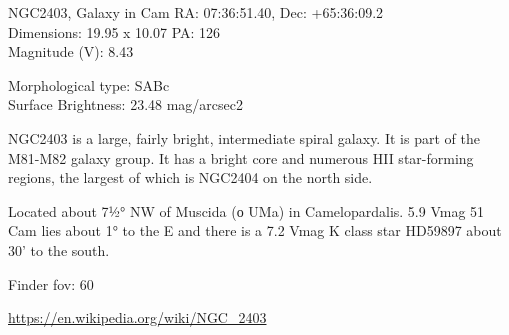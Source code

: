 \begin{block}{NGC2403, Galaxy in Cam}
    RA: 07:36:51.40, Dec: +65:36:09.2 \\ 
    Dimensions: 19.95 x 10.07 PA: 126 \\ 
    Magnitude (V): 8.43

    Morphological type: SABc \\ 
    Surface Brightness: 23.48 mag/arcsec2 

    NGC2403 is a large, fairly bright, intermediate spiral galaxy. It is part
    of the M81-M82 galaxy group. It has a bright core and numerous HII
    star-forming regions, the largest of which is NGC2404 on the north side.

    Located about 7½° NW of Muscida (ο UMa) in Camelopardalis. 5.9 Vmag 51 Cam
    lies about 1° to the E and there is a 7.2 Vmag K class star HD59897 about 30'
    to the south. 


    Finder fov: 60 

    \url{https://en.wikipedia.org/wiki/NGC_2403} 
\end{block}
